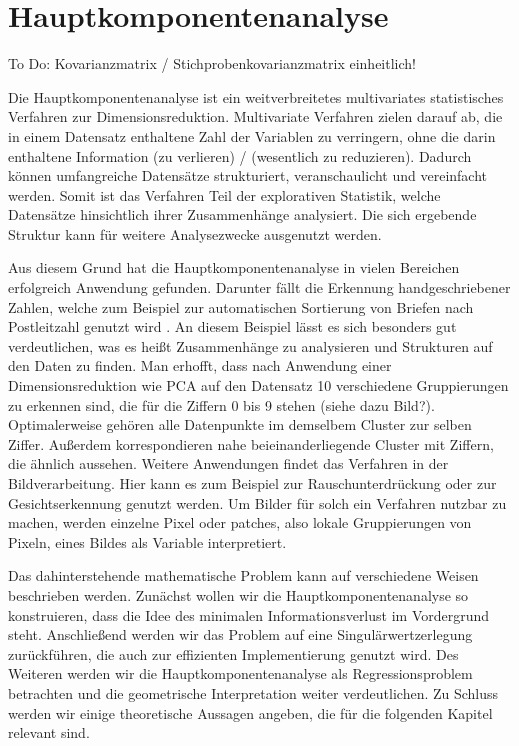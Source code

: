 \chapter{Hauptkomponentenanalyse}

\label{pca}

To Do: Kovarianzmatrix / Stichprobenkovarianzmatrix einheitlich!

Die Hauptkomponentenanalyse ist ein weitverbreitetes multivariates statistisches Verfahren zur Dimensionsreduktion. Multivariate Verfahren zielen darauf ab, die in einem Datensatz enthaltene Zahl der Variablen zu verringern, ohne die darin enthaltene Information (zu verlieren) / (wesentlich zu reduzieren). Dadurch können umfangreiche Datensätze strukturiert, veranschaulicht und vereinfacht werden. Somit ist das Verfahren Teil der explorativen Statistik, welche Datensätze hinsichtlich ihrer Zusammenhänge analysiert. Die sich ergebende Struktur kann für weitere Analysezwecke ausgenutzt werden.

Aus diesem Grund hat die Hauptkomponentenanalyse in vielen Bereichen erfolgreich Anwendung gefunden. Darunter fällt die Erkennung handgeschriebener Zahlen, welche zum Beispiel zur automatischen Sortierung von Briefen nach Postleitzahl genutzt wird \cite{hastie_elements}. An diesem Beispiel lässt es sich besonders gut verdeutlichen, was es heißt Zusammenhänge zu analysieren und Strukturen auf den Daten zu finden. Man erhofft, dass nach Anwendung einer Dimensionsreduktion wie PCA auf den Datensatz 10 verschiedene Gruppierungen zu erkennen sind, die für die Ziffern 0 bis 9 stehen (siehe dazu Bild?). Optimalerweise gehören alle Datenpunkte im demselbem Cluster zur selben Ziffer. Außerdem korrespondieren nahe beieinanderliegende Cluster mit Ziffern, die ähnlich aussehen. Weitere Anwendungen findet das Verfahren in der Bildverarbeitung. Hier kann es zum Beispiel zur Rauschunterdrückung \cite{babu} oder zur Gesichtserkennung \cite{jiang} genutzt werden. Um Bilder für solch ein Verfahren nutzbar zu machen, werden einzelne Pixel oder patches, also lokale Gruppierungen von Pixeln, eines Bildes als Variable interpretiert.

Das dahinterstehende mathematische Problem kann auf verschiedene Weisen beschrieben werden. Zunächst wollen wir die Hauptkomponentenanalyse so konstruieren, dass die Idee des minimalen Informationsverlust im Vordergrund steht. Anschließend werden wir das Problem auf eine Singulärwertzerlegung zurückführen, die auch zur effizienten Implementierung genutzt wird. Des Weiteren werden wir die Hauptkomponentenanalyse als Regressionsproblem betrachten und die geometrische Interpretation weiter verdeutlichen. Zu Schluss werden wir einige theoretische Aussagen angeben, die für die folgenden Kapitel relevant sind.

